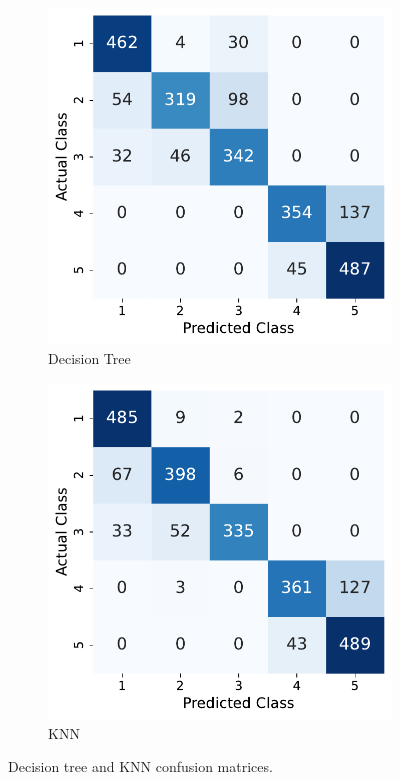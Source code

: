 \documentclass[10pt, a4paper, twocolumn]{article}
\begin{document}
\begin{figure}
\centering
    \begin{subfigure}[t]{0.40\linewidth}
        \includegraphics[width=\linewidth]{immagini simone/dtc_tuned_conf_mtx.pdf}
        \caption{Decision Tree}
        \label{fig:dtroc}
    \end{subfigure}
    \hspace{0.4cm}
    \begin{subfigure}[t]{0.40\columnwidth}
        \includegraphics[width=\linewidth]{immagini simone/knn_tuned_conf_mtx.pdf}
        \caption{KNN}
        \label{fig:knnroc}
    \end{subfigure}
\caption{Decision tree and KNN confusion matrices.}\label{fig:comparison_confusion}
\end{figure}
\end{document}
